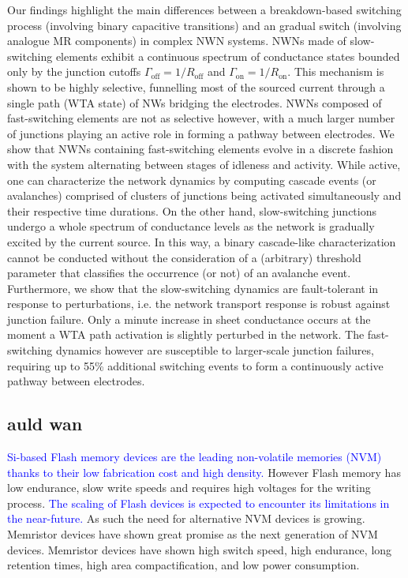 Our findings highlight the main differences between a breakdown-based switching process (involving binary capacitive transitions) and an gradual switch (involving analogue MR components) in complex NWN systems. NWNs made of slow-switching elements exhibit a continuous spectrum of conductance states bounded only by the junction cutoffs  $\Gamma_{\textrm{off}} = 1/R_{\textrm{off}}$ and $\Gamma_{\textrm{on}} = 1/R_{\textrm{on}}$. This mechanism is shown to be highly selective, funnelling most of the sourced current through a single path (WTA state) of NWs bridging the electrodes. NWNs composed of fast-switching elements are not as selective however, with a much larger number of junctions playing an active role in forming a pathway between electrodes. We show that NWNs containing fast-switching elements evolve in a discrete fashion with the system alternating between stages of idleness and activity. While active, one can characterize the network dynamics by computing cascade events (or avalanches) comprised of clusters of junctions being activated simultaneously and their respective time durations. On the other hand, slow-switching junctions undergo a whole spectrum of conductance levels as the network is gradually excited by the current source. In this way, a binary cascade-like characterization cannot be conducted without the consideration of a (arbitrary) threshold parameter that classifies the occurrence (or not) of an avalanche event.
Furthermore, we show that the slow-switching dynamics are fault-tolerant in response to perturbations, i.e. the network transport response is robust against junction failure. Only a minute increase in sheet conductance occurs at the moment a WTA path activation is slightly perturbed in the network. The fast-switching dynamics however are susceptible to larger-scale junction failures, requiring up to 55\% additional switching events to form a continuously active pathway between electrodes.   
\subsection{auld wan}

\textcolor{blue}{Si-based Flash memory devices are the leading non-volatile memories (NVM) thanks to their low fabrication cost and high density.} However Flash memory has low endurance, slow write speeds and requires high voltages for the writing process\cite{lim2015,waser2009}. \textcolor{blue}{The scaling of Flash devices is expected to encounter its limitations in the near-future.} As such the need for alternative NVM devices is growing. Memristor\cite{chua1971} devices have shown great promise as the next generation of NVM devices. Memristor devices have shown high switch speed, high endurance, long retention times, high area compactification, and low power consumption\cite{Torrezan2011,yang2010,kim2012,choi2013,lee2011,lee2015}.

